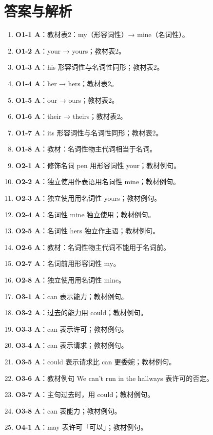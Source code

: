 \documentclass[11pt,a4paper]{ctexart}
\begin{document}
\section*{答案与解析}
\small
\begin{enumerate}[leftmargin=1.6em,itemsep=2pt]
\item \textbf{O1-1 A}：教材表2：my（形容词性）→ mine（名词性）。
\item \textbf{O1-2 A}：your → yours；教材表2。
\item \textbf{O1-3 A}：his 形容词性与名词性同形；教材表2。
\item \textbf{O1-4 A}：her → hers；教材表2。
\item \textbf{O1-5 A}：our → ours；教材表2。
\item \textbf{O1-6 A}：their → theirs；教材表2。
\item \textbf{O1-7 A}：its 形容词性与名词性同形；教材表2。
\item \textbf{O1-8 A}：教材：名词性物主代词相当于名词。
\item \textbf{O2-1 A}：修饰名词 pen 用形容词性 your；教材例句。
\item \textbf{O2-2 A}：独立使用作表语用名词性 mine；教材例句。
\item \textbf{O2-3 A}：独立使用用名词性 yours；教材例句。
\item \textbf{O2-4 A}：名词性 mine 独立使用；教材例句。
\item \textbf{O2-5 A}：名词性 hers 独立作主语；教材例句。
\item \textbf{O2-6 A}：教材：名词性物主代词不能用于名词前。
\item \textbf{O2-7 A}：名词前用形容词性 my。
\item \textbf{O2-8 A}：独立使用用名词性 mine。
\item \textbf{O3-1 A}：can 表示能力；教材例句。
\item \textbf{O3-2 A}：过去的能力用 could；教材例句。
\item \textbf{O3-3 A}：can 表示许可；教材例句。
\item \textbf{O3-4 A}：can 表示请求；教材例句。
\item \textbf{O3-5 A}：could 表示请求比 can 更委婉；教材例句。
\item \textbf{O3-6 A}：教材例句 We can’t run in the hallways 表许可的否定。
\item \textbf{O3-7 A}：主句过去时，用 could；教材例句。
\item \textbf{O3-8 A}：can 表能力；教材例句。
\item \textbf{O4-1 A}：may 表许可「可以」；教材例句。

\end{enumerate}
\end{document}
